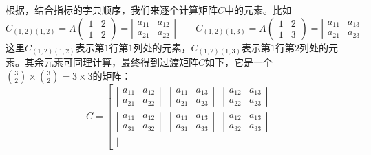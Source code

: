 \begin{example}[]
根据，结合指标的字典顺序，我们来逐个计算矩阵$C$中的元素。比如
\[
C_{(1,2)(1,2)}=A\left(\begin{array}{cc} 1 & 2  \\ 1 & 2 \end{array}\right)=\left|\begin{array}{ccc}
	a_{11} & a_{12}   \\
	a_{21} & a_{22}  
	\end{array}\right|\quad\quad C_{(1,2)(1,3)}=A\left(\begin{array}{cc} 1 & 2  \\ 1 & 3 \end{array}\right)=\left|\begin{array}{ccc}
		a_{11} & a_{13}   \\
		a_{21} & a_{23}  
		\end{array}\right|
\]
这里$C_{(1,2)(1,2)}$表示第$1$行第$1$列处的元素，$C_{(1,2)(1,3)}$表示第$1$行第$2$列处的元素。其余元素可同理计算，最终得到过渡矩阵$C$如下，它是一个$\binom{3}{2}\times \binom{3}{2}=3\times 3$的矩阵：
\[
	C=\left[\begin{array}{ccc}
		{\left|\begin{array}{ccc}
			a_{11} & a_{12}   \\
			a_{21} & a_{22}  
		\end{array}\right|} & {\left|\begin{array}{ccc}
				a_{11} & a_{13}   \\
				a_{21} & a_{23}  
		\end{array}\right|} & {\left|\begin{array}{ccc}
				a_{12} & a_{13}   \\
				a_{22} & a_{23}  
				\end{array}\right|} \\
		{\left|\begin{array}{ccc}
				a_{11} & a_{12}   \\
				a_{31} & a_{32}  
		\end{array}\right|} & {\left|\begin{array}{ccc}
				a_{11} & a_{13}   \\
				a_{31} & a_{33}  
		\end{array}\right|} & {\left|\begin{array}{ccc}
				a_{12} & a_{13}   \\
				a_{32} & a_{33}  
		\end{array}\right|} \\
		{\left|\begin{array}{ccc}

\end{array}}
\end{array}\]
\end{example}
